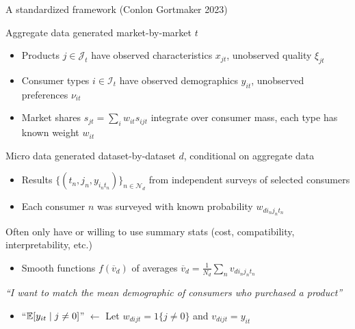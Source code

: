 \begin{frame}[label=framework]{A standardized framework (Conlon Gortmaker 2023)}
    \begin{wideitemize}
        
        \item Aggregate data generated market-by-market $t$
        \begin{itemize}
            \item \alert{Products} $j \in \mathcal{J}_t$ have observed characteristics $x_{jt}$, unobserved quality $\xi_{jt}$
            \item \alert{Consumer types} $i \in \mathcal{I}_t$ have observed demographics $y_{it}$, unobserved preferences $\nu_{it}$
            \item \alert{Market shares} $s_{jt} = \sum_i w_{it} s_{ijt}$ integrate over consumer mass, each type has known weight $w_{it}$
        \end{itemize}
        
        \item Micro data generated dataset-by-dataset $d$, conditional on aggregate data
        \begin{itemize}
            \item Results $\{(t_n, j_n, y_{i_nt_n})\}_{n \in \mathcal{N}_d}$ from \alert{independent surveys} of \alert{selected consumers}
            \item Each consumer $n$ was surveyed with known probability $w_{di_nj_nt_n}$
        \end{itemize}
        
        \item Often only have or willing to use \alert{summary stats} (cost, compatibility, interpretability, etc.)
        \begin{itemize}
            \item Smooth functions $f(\overline{v}_d)$ of averages $\overline{v}_d = \frac{1}{N_d} \sum_n v_{di_nj_nt_n}$
        \end{itemize}
        
        \item \textit{``I want to match the mean demographic of consumers who purchased a product''}
        \begin{itemize}
            \item ``$\mathbb{E}[y_{it} \mid j \neq 0]$'' $\leftarrow$ Let $w_{dijt} = 1\{j \neq 0\}$ and $v_{dijt} = y_{it}$
        \end{itemize}
    \end{wideitemize}
\end{frame}



